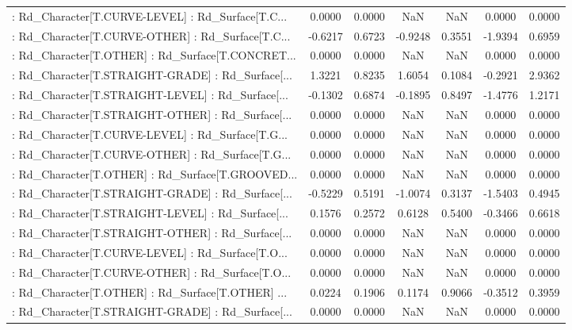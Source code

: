 \begin{longtable}{p{4cm}cccccc}
 : Rd\_Character[T.CURVE-LEVEL] : Rd\_Surface[T.C... &  0.0000 &    0.0000 &     NaN &          NaN &  0.0000 &  0.0000 \\
 : Rd\_Character[T.CURVE-OTHER] : Rd\_Surface[T.C... & -0.6217 &    0.6723 & -0.9248 &       0.3551 & -1.9394 &  0.6959 \\
 : Rd\_Character[T.OTHER] : Rd\_Surface[T.CONCRET... &  0.0000 &    0.0000 &     NaN &          NaN &  0.0000 &  0.0000 \\
 : Rd\_Character[T.STRAIGHT-GRADE] : Rd\_Surface[... &  1.3221 &    0.8235 &  1.6054 &       0.1084 & -0.2921 &  2.9362 \\
 : Rd\_Character[T.STRAIGHT-LEVEL] : Rd\_Surface[... & -0.1302 &    0.6874 & -0.1895 &       0.8497 & -1.4776 &  1.2171 \\
 : Rd\_Character[T.STRAIGHT-OTHER] : Rd\_Surface[... &  0.0000 &    0.0000 &     NaN &          NaN &  0.0000 &  0.0000 \\
 : Rd\_Character[T.CURVE-LEVEL] : Rd\_Surface[T.G... &  0.0000 &    0.0000 &     NaN &          NaN &  0.0000 &  0.0000 \\
 : Rd\_Character[T.CURVE-OTHER] : Rd\_Surface[T.G... &  0.0000 &    0.0000 &     NaN &          NaN &  0.0000 &  0.0000 \\
 : Rd\_Character[T.OTHER] : Rd\_Surface[T.GROOVED... &  0.0000 &    0.0000 &     NaN &          NaN &  0.0000 &  0.0000 \\
 : Rd\_Character[T.STRAIGHT-GRADE] : Rd\_Surface[... & -0.5229 &    0.5191 & -1.0074 &       0.3137 & -1.5403 &  0.4945 \\
 : Rd\_Character[T.STRAIGHT-LEVEL] : Rd\_Surface[... &  0.1576 &    0.2572 &  0.6128 &       0.5400 & -0.3466 &  0.6618 \\
 : Rd\_Character[T.STRAIGHT-OTHER] : Rd\_Surface[... &  0.0000 &    0.0000 &     NaN &          NaN &  0.0000 &  0.0000 \\
 : Rd\_Character[T.CURVE-LEVEL] : Rd\_Surface[T.O... &  0.0000 &    0.0000 &     NaN &          NaN &  0.0000 &  0.0000 \\
 : Rd\_Character[T.CURVE-OTHER] : Rd\_Surface[T.O... &  0.0000 &    0.0000 &     NaN &          NaN &  0.0000 &  0.0000 \\
 : Rd\_Character[T.OTHER] : Rd\_Surface[T.OTHER] ... &  0.0224 &    0.1906 &  0.1174 &       0.9066 & -0.3512 &  0.3959 \\
 : Rd\_Character[T.STRAIGHT-GRADE] : Rd\_Surface[... &  0.0000 &    0.0000 &     NaN &          NaN &  0.0000 &  0.0000 \\

\end{longtable}
